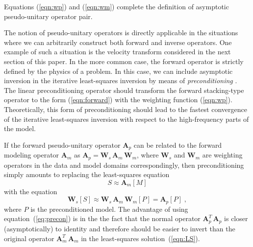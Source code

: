 Equations (\ref{eqn:wp}) and (\ref{eqn:wm}) complete the definition of
asymptotic pseudo-unitary operator pair.
\par
The notion of pseudo-unitary operators is directly applicable in the
situations where we can arbitrarily construct both forward and inverse
operators. One example of such a situation is the velocity transform
considered in the next section of this paper.  In the more common
case, the forward operator is strictly defined by the physics of a
problem. In this case, we can include asymptotic inversion in the
iterative least-squares inversion by means of {\em preconditioning}
\cite[]{jin,lambare}.  The linear preconditioning operator should
transform the forward stacking-type operator to the form
(\ref{eqn:forward}) with the weighting function (\ref{eqn:wp}).
Theoretically, this form of preconditioning should lead to the fastest
convergence of the iterative least-squares inversion with respect to
the high-frequency parts of the model.

If the forward pseudo-unitary operator $\mathbf{A}_p$ can be related to
the forward modeling operator $\mathbf{A}_m$ as $\mathbf{A}_p =
\mathbf{W}_s\,\mathbf{A}_m\,\mathbf{W}_m$, where $\mathbf{W}_s$ and
$\mathbf{W}_m$ are weighting operators in the data and model domains
correspondingly, then preconditioning simply amounts to replacing the
least-squares equation
\begin{equation}
  \label{eq:lse}
S \approx \mathbf{A}_m [M]
\end{equation}
with the equation
\begin{equation}
  \label{eq:precon}
  \mathbf{W}_s [S] \approx 
  \mathbf{W}_s\,\mathbf{A}_m\,\mathbf{W}_m [P] = \mathbf{A}_p [P]\;,
\end{equation}
where $P$ is the preconditioned model. The advantage of using
equation~(\ref{eq:precon}) is in the the fact that the normal operator
$\mathbf{A}_p^T\,\mathbf{A}_p$ is closer (asymptotically) to identity and
therefore should be easier to invert than the original operator
$\mathbf{A}_m^T\,\mathbf{A}_m$ in the least-squares solution~(\ref{eqn:LS}).




